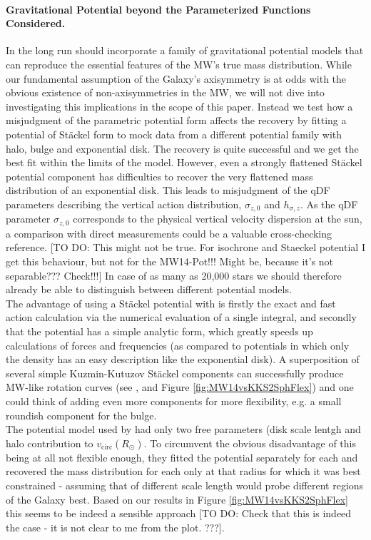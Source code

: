 \paragraph{Gravitational Potential beyond the Parameterized Functions Considered.}  In the long run \RM should incorporate a family of gravitational potential models that can reproduce the essential features of the MW's true mass distribution. While our fundamental assumption of the Galaxy's axisymmetry is at odds with the obvious existence of non-axisymmetries in the MW, we will not dive into investigating this implications in the scope of this paper. Instead we test how a misjudgment of the parametric potential form affects the recovery by fitting a potential of St\"{a}ckel form \citep{bat94} to mock data from a different potential family with halo, bulge and exponential disk. The recovery is quite successful and we get the best fit within the limits of the model. However, even a strongly flattened St\"{a}ckel potential component has difficulties to recover the very flattened mass distribution of an exponential disk. This leads to misjudgment of the qDF parameters describing the vertical action distribution, $\sigma_{z,0}$ and $h_{\sigma,z}$. As the qDF parameter $\sigma_{z,0}$ corresponds to the physical vertical velocity dispersion at the sun, a comparison with direct measurements could be a valuable cross-checking reference. [TO DO: This might not be true. For isochrone and Staeckel potential I get this behaviour, but not for the MW14-Pot!!! Might be, because it's not separable??? Check!!!] In case of as many as 20,000 stars we should therefore already be able to distinguish between different potential models.
\\The advantage of using a St\"{a}ckel potential with \RM is firstly the exact and fast action calculation via the numerical evaluation of a single integral, and secondly that the potential has a simple analytic form, which greatly speeds up calculations of forces and frequencies (as compared to potentials in which only the density has an easy description like the exponential disk). A superposition of several simple Kuzmin-Kutuzov St\"{a}ckel components can successfully produce MW-like rotation curves (see \citet{bat94}, \citet{2003MNRAS.340..752F} and Figure \ref{fig:MW14vsKKS2SphFlex}) and one could think of adding even more components for more flexibility, e.g. a small roundish component for the bulge.
\\The potential model used by \citet{bov13} had only two free parameters (disk scale lentgh and halo contribution to $v_\text{circ}(R_\odot)$. To circumvent the obvious disadvantage of this being at all not flexible enough, they fitted the potential separately for each \MAP and recovered the mass distribution for each \MAP only at that radius for which it was best constrained - assuming that \MAPs of different scale length would probe different regions of the Galaxy best. Based on our results in Figure \ref{fig:MW14vsKKS2SphFlex} this seems to be indeed a sensible approach [TO DO: Check that this is indeed the case - it is not clear to me from the plot. ???].
